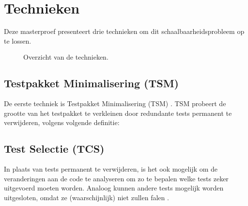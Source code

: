 \section{Technieken}
\noindent Deze masterproef presenteert drie technieken om dit schaalbaarheidsprobleem op te lossen.

\begin{figure*}[t]
	\centering
	\hfill
	\hfill
	\caption{Overzicht van de technieken.}
\end{figure*}

\subsection{Testpakket Minimalisering (TSM)}
\noindent De eerste techniek is Testpakket Minimalisering (TSM) \cite{10.1002/stv.430}. TSM probeert de grootte van het testpakket te verkleinen door redundante tests permanent te verwijderen, volgens volgende definitie:\\

\noindent{}

\subsection{Test Selectie (TCS)}
\noindent In plaats van tests permanent te verwijderen, is het ook mogelijk om de veranderingen aan de code te analyseren om zo te bepalen welke tests zeker uitgevoerd moeten worden. Analoog kunnen andere tests mogelijk worden uitgesloten, omdat ze (waarschijnlijk) niet zullen falen \cite{10.1002/stv.430}.\\


